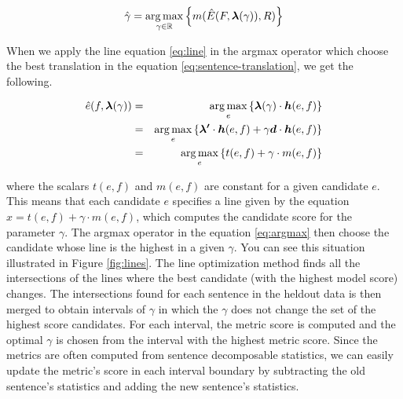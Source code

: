\begin{equation}
  \hat{\gamma} = \operatorname*{arg\,max}_{\gamma \in \mathbb{R}} \left\{ m(\hat{E}(F,\boldsymbol{\lambda}(\gamma)),R) \right\}
    \label{eq:line-opt}
\end{equation}

When we apply the line equation \ref{eq:line} in the argmax operator which
choose the best translation in the equation \ref{eq:sentence-translation}, we
get the following.

\begin{eqnarray}
  \hat{e}(f, \boldsymbol{\lambda}(\gamma))
    & = & \operatorname*{arg\,max}_{e} \left\{ \boldsymbol{\lambda}(\gamma) \cdot  \boldsymbol{h}(e, f) \right\} \\
    & = & \operatorname*{arg\,max}_{e} \left\{ \boldsymbol{\lambda'} \cdot \boldsymbol{h}(e, f) + \gamma \boldsymbol{d} \cdot \boldsymbol{h}(e, f) \right\} \\
    & = & \operatorname*{arg\,max}_{e} \left\{ t(e,f) + \gamma \cdot m(e,f) \right\} \label{eq:argmax}
\end{eqnarray}

\noindent where the scalars $t(e,f)$ and $m(e,f)$ are constant for a given
candidate $e$. This means that each candidate $e$ specifies a line given by
the equation $x = t(e,f) + \gamma \cdot m(e,f)$, which computes the candidate
score for the parameter $\gamma$. The argmax operator in the equation
\eqref{eq:argmax} then choose the candidate whose line is the highest in a
given $\gamma$. You can see this situation illustrated in Figure
\ref{fig:lines}.  The line optimization method finds all the intersections of
the lines where the best candidate (with the highest model score) changes. The
intersections found for each sentence in the heldout data is then merged to
obtain intervals of $\gamma$ in which the $\gamma$ does not change the set of
the highest score candidates.  For each interval, the metric score is computed
and the optimal $\gamma$ is chosen from the interval with the highest metric
score. Since the metrics are often computed from sentence decomposable
statistics, we can easily update the metric's score in each interval boundary
by subtracting the old sentence's statistics and adding the new sentence's
statistics.


